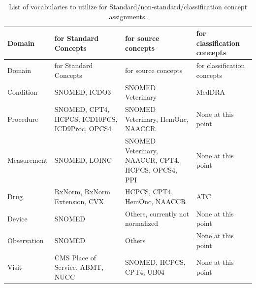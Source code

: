 \documentclass[
  letterpaper,
  paper=7in:10in,
  pagesize=pdftex,
  headinclude=on,
  footinclude=on,
  12pt]{scrbook}
\begin{document}
\begin{landscape}

\begin{longtable}[]{@{}
  >{\raggedright\arraybackslash}p{}
  >{\raggedright\arraybackslash}p{}
  >{\raggedright\arraybackslash}p{}
  >{\raggedright\arraybackslash}p{}@{}}
\caption{List of vocabularies to utilize for
Standard/non-standard/classification concept
assignments.}\label{tbl-part-chapter-shorttableterm}\tabularnewline
\toprule\noalign{}
\begin{minipage}[b]{\linewidth}\raggedright
Domain
\end{minipage} & \begin{minipage}[b]{\linewidth}\raggedright
for Standard Concepts
\end{minipage} & \begin{minipage}[b]{\linewidth}\raggedright
for source concepts
\end{minipage} & \begin{minipage}[b]{\linewidth}\raggedright
for classification concepts
\end{minipage} \\
\midrule\noalign{}
\endfirsthead
\toprule\noalign{}
\begin{minipage}[b]{\linewidth}\raggedright
Domain
\end{minipage} & \begin{minipage}[b]{\linewidth}\raggedright
for Standard Concepts
\end{minipage} & \begin{minipage}[b]{\linewidth}\raggedright
for source concepts
\end{minipage} & \begin{minipage}[b]{\linewidth}\raggedright
for classification concepts
\end{minipage} \\
\midrule\noalign{}
\endhead
\bottomrule\noalign{}
\endlastfoot
Condition & SNOMED, ICDO3 & SNOMED Veterinary & MedDRA \\
Procedure & SNOMED, CPT4, HCPCS, ICD10PCS, ICD9Proc, OPCS4 & SNOMED
Veterinary, HemOnc, NAACCR & None at this point \\
Measurement & SNOMED, LOINC & SNOMED Veterinary, NAACCR, CPT4, HCPCS,
OPCS4, PPI & None at this point \\
Drug & RxNorm, RxNorm Extension, CVX & HCPCS, CPT4, HemOnc, NAACCR &
ATC \\
Device & SNOMED & Others, currently not normalized & None at this
point \\
Observation & SNOMED & Others & None at this point \\
Visit & CMS Place of Service, ABMT, NUCC & SNOMED, HCPCS, CPT4, UB04 &
None at this point \\
\end{longtable}

\end{landscape}
\end{document}
